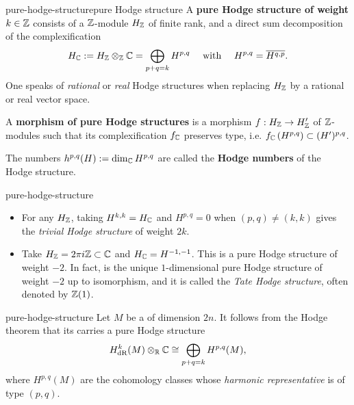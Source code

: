 \begin{topic}{pure-hodge-structure}{pure Hodge structure}
    A \textbf{pure Hodge structure of weight $k \in \mathbb{Z}$} consists of a $\mathbb{Z}$-module $H_{\mathbb{Z}}$ of finite rank, and a direct sum decomposition of the complexification
    \[ H_{\mathbb{C}} := H_{\mathbb{Z}} \otimes_{\mathbb{Z}} \mathbb{C} = \bigoplus_{p + q = k} H^{p, q} \quad \text{ with } \quad H^{p, q} = \overline{H^{q, p}} . \]
    One speaks of \textit{rational} or \textit{real} Hodge structures when replacing $H_{\mathbb{Z}}$ by a rational or real vector space.
    
    A \textbf{morphism of pure Hodge structures} is a morphism $f : H_{\mathbb{Z}} \to H'_{\mathbb{Z}}$ of $\mathbb{Z}$-modules such that its complexification $f_{\mathbb{C}}$ preserves type, i.e. $f_{\mathbb{C}}\left(H^{p, q}\right) \subset (H')^{p, q}$.
    
    The numbers $h^{p, q}(H) := \dim_{\mathbb{C}} H^{p, q}$ are called the \textbf{Hodge numbers} of the Hodge structure.
\end{topic}

\begin{example}{pure-hodge-structure}
    \begin{itemize}
        \item For any $H_{\mathbb{Z}}$, taking $H^{k,k} = H_{\mathbb{C}}$ and $H^{p, q} = 0$ when $(p, q) \ne (k, k)$ gives the \textit{trivial Hodge structure} of weight $2k$.
        \item Take $H_{\mathbb{Z}} = 2 \pi i \mathbb{Z} \subset \mathbb{C}$ and $H_{\mathbb{C}} = H^{-1, -1}$. This is a pure Hodge structure of weight $-2$. In fact, is the unique $1$-dimensional pure Hodge structure of weight $-2$ up to isomorphism, and it is called the \textit{Tate Hodge structure}, often denoted by $\mathbb{Z}(1)$.
    \end{itemize}
\end{example}

\begin{example}{pure-hodge-structure}
    Let $M$ be a  of dimension $2n$. It follows from the Hodge theorem that its  carries a pure Hodge structure
    \[ H_\textup{dR}^k(M) \otimes_{\mathbb{R}} \mathbb{C} \cong \bigoplus_{p + q = k} H^{p, q}(M) , \]
    where $H^{p, q}(M)$ are the cohomology classes whose \textit{harmonic representative} is of type $(p, q)$.
\end{example}

